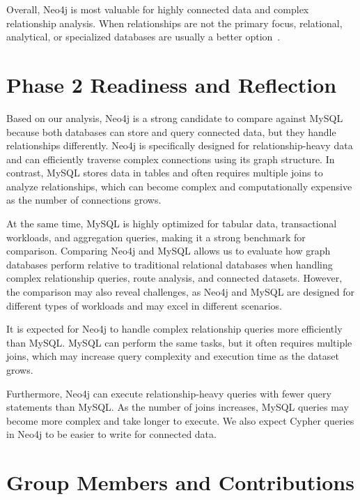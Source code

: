 \documentclass[10pt,a4paper,twocolumn]{article}
\begin{document}
Overall, Neo4j is most valuable for highly connected data and complex relationship analysis. When relationships are not the primary focus, relational, analytical, or specialized databases are usually a better option~\cite{mussin2025performance}.

\section{Phase 2 Readiness and Reflection}

Based on our analysis, Neo4j is a strong candidate to compare against MySQL because both databases can store and query connected data, but they handle relationships differently. Neo4j is specifically designed for relationship-heavy data and can efficiently traverse complex connections using its graph structure. In contrast, MySQL stores data in tables and often requires multiple joins to analyze relationships, which can become complex and computationally expensive as the number of connections grows.

At the same time, MySQL is highly optimized for tabular data, transactional workloads, and aggregation queries, making it a strong benchmark for comparison. Comparing Neo4j and MySQL allows us to evaluate how graph databases perform relative to traditional relational databases when handling complex relationship queries, route analysis, and connected datasets. However, the comparison may also reveal challenges, as Neo4j and MySQL are designed for different types of workloads and may excel in different scenarios.

It is expected for Neo4j to handle complex relationship queries more efficiently than MySQL. MySQL can perform the same tasks, but it often requires multiple joins, which may increase query complexity and execution time as the dataset grows.

Furthermore, Neo4j can execute relationship-heavy queries with fewer query statements than MySQL. As the number of joins increases, MySQL queries may become more complex and take longer to execute. We also expect Cypher queries in Neo4j to be easier to write for connected data.

\section{Group Members and Contributions}
\end{document}
